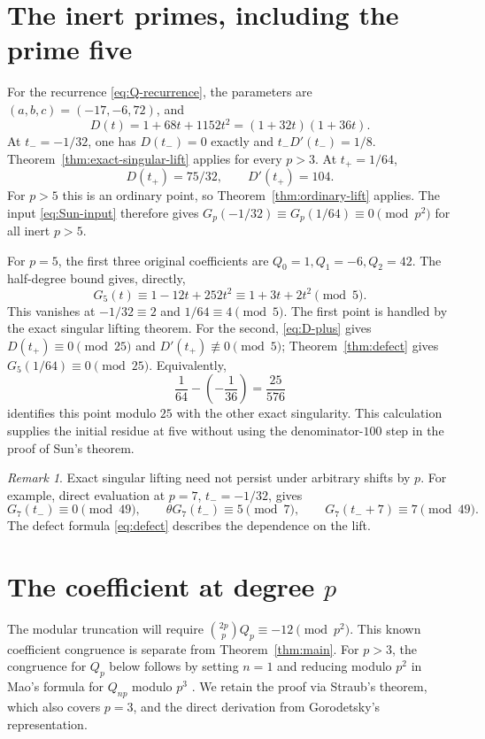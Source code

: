 \documentclass[11pt,a4paper]{article}
\theoremstyle{remark}
\newtheorem{remark}[theorem]{Remark}
\begin{document}
\section{The inert primes, including the prime five}\label{sec:inert}
For the recurrence \eqref{eq:Q-recurrence}, the parameters are
$(a,b,c)=(-17,-6,72)$, and
\begin{equation}\label{eq:D-Q}
 D(t)=1+68t+1152t^2=(1+32t)(1+36t).
\end{equation}
At $t_-=-1/32$, one has $D(t_-)=0$ exactly and
$t_-D'(t_-)=1/8$.
Theorem~\ref{thm:exact-singular-lift} applies for every $p>3$.
At $t_+=1/64$,
\begin{equation}\label{eq:D-plus}
 D(t_+)=75/32,\qquad D'(t_+)=104.
\end{equation}
For $p>5$ this is an ordinary point, so
Theorem~\ref{thm:ordinary-lift} applies.
The input \eqref{eq:Sun-input} therefore gives
$G_p(-1/32)\equiv G_p(1/64)\equiv0\pmod{p^2}$ for all inert $p>5$.

For $p=5$, the first three original coefficients are
$Q_0=1,Q_1=-6,Q_2=42$. The half-degree bound gives, directly,
\begin{equation}\label{eq:p5-polynomial}
 G_5(t)\equiv1-12t+252t^2\equiv1+3t+2t^2\pmod5.
\end{equation}
This vanishes at $-1/32\equiv2$ and $1/64\equiv4\pmod5$.
The first point is handled by the exact singular lifting theorem.
For the second, \eqref{eq:D-plus} gives
$D(t_+)\equiv0\pmod{25}$ and $D'(t_+)\not\equiv0\pmod5$;
Theorem~\ref{thm:defect} gives $G_5(1/64)\equiv0\pmod{25}$.
Equivalently,
\[
 \frac1{64}-\left(-\frac1{36}\right)=\frac{25}{576}
\]
identifies this point modulo $25$ with the other exact singularity.
This calculation supplies the initial residue at five without using
the denominator-$100$ step in the proof of Sun's theorem.

\begin{remark}\label{rem:singular-shift}
Exact singular lifting need not persist under arbitrary shifts by $p$.
For example, direct evaluation at $p=7$, $t_-=-1/32$, gives
\[
 G_7(t_-)\equiv0\pmod{49},\qquad
 \theta G_7(t_-)\equiv5\pmod7,\qquad
 G_7(t_-+7)\equiv7\pmod{49}.
\]
The defect formula \eqref{eq:defect} describes the dependence on the lift.
\end{remark}

\section{The coefficient at degree \texorpdfstring{$p$}{p}}
\label{sec:endpoint}
The modular truncation will require
$\binom{2p}p Q_p\equiv-12\pmod{p^2}$.
This known coefficient congruence is separate from Theorem~\ref{thm:main}.
For $p>3$, the congruence for $Q_p$ below follows by setting $n=1$
and reducing modulo $p^2$ in Mao's formula for $Q_{np}$ modulo $p^3$
\cite[p.~3, Theorem~1.4]{mao}. We retain the proof via Straub's theorem,
which also covers $p=3$, and the direct derivation from Gorodetsky's
representation.
\end{document}
